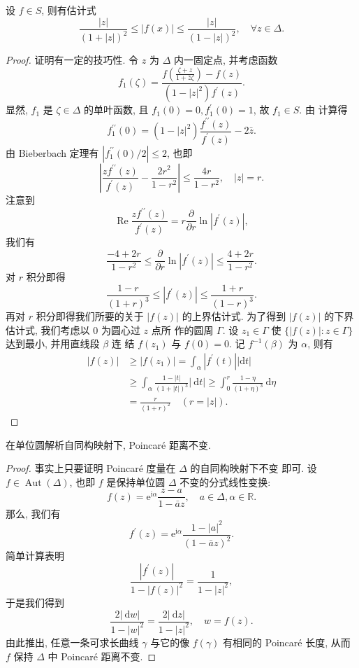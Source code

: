 \begin{thm}[偏差定理] \label{thm: piancha theorem}
    设 $f\in S$, 则有估计式
    \[\frac{|z|}{(1+|z|)^2}\leqslant |f(x)|\leqslant \frac{|z|}{(1-|z|)^2}, \quad\forall z\in \Delta .\]
\end{thm}
\begin{proof}
    证明有一定的技巧性. 令 $z$ 为 $\Delta$ 内一固定点, 并考虑函数
$$
f_1(\zeta)=\frac{f\left(\frac{\zeta+z}{1+\bar{z} \zeta}\right)-f(z)}{\left(1-|z|^2\right) f^{\prime}(z)} .
$$
显然, $f_1$ 是 $\zeta \in \Delta$ 的单叶函数, 且 $f_1(0)=0, f_1^{\prime}(0)=1$, 故 $f_1 \in S$. 由 计算得
$$
f_1^{\prime \prime}(0)=\left(1-|z|^2\right) \frac{f^{\prime \prime}(z)}{f^{\prime}(z)}-2 \bar{z} .
$$
由 Bieberbach 定理有 $\left|f_1^{\prime \prime}(0) / 2\right| \leqslant 2$, 也即
$$
\left|\frac{z f^{\prime \prime}(z)}{f^{\prime}(z)}-\frac{2 r^2}{1-r^2}\right| \leqslant \frac{4 r}{1-r^2}, \quad|z|=r .
$$
注意到
$$
\operatorname{Re} \frac{z f^{\prime \prime}(z)}{f^{\prime}(z)}=r \frac{\partial}{\partial r} \ln \left|f^{\prime}(z)\right|,
$$
我们有
$$
\frac{-4+2 r}{1-r^2} \leqslant \frac{\partial}{\partial r} \ln \left|f^{\prime}(z)\right| \leqslant \frac{4+2 r}{1-r^2} .
$$
对 $r$ 积分即得
$$
\frac{1-r}{(1+r)^3} \leqslant\left|f^{\prime}(z)\right| \leqslant \frac{1+r}{(1-r)^3} .
$$
再对 $r$ 积分即得我们所要的关于 $|f(z)|$ 的上界估计式.
为了得到 $|f(z)|$ 的下界估计式, 我们考虑以 0 为圆心过 $z$ 点所 作的圆周 $\Gamma$. 设 $z_1 \in \Gamma$ 使 $\{|f(z)|: z \in \Gamma\}$ 达到最小, 并用直线段 $\beta$ 连 结 $f\left(z_1\right)$ 与 $f(0)=0$. 记 $f^{-1}(\beta)$ 为 $\alpha$, 则有
$$
\begin{aligned}
|f(z)| & \geqslant\left|f\left(z_1\right)\right|=\int_\alpha\left|f^{\prime}(t)\right||\mathrm{d} t| \\
& \geqslant \int_\alpha \frac{1-|t|}{(1+|t|)^3}|\mathrm{~d} t| \geqslant \int_0^r \frac{1-\eta}{(1+\eta)^3} \mathrm{~d} \eta \\
& =\frac{r}{(1+r)^2} \quad(r=|z|) .
\end{aligned}
$$
\end{proof}
\begin{prop}
    在单位圆解析自同构映射下, Poincar\'{e} 距离不变.
\end{prop}
\begin{proof}
    事实上只要证明 Poincaré 度量在 $\Delta$ 的自同构映射下不变 即可.
设 $f \in \operatorname{Aut}(\Delta)$, 也即 $f$ 是保持单位圆 $\Delta$ 不变的分式线性变换:
$$
f(z)=\mathrm{e}^{\mathrm{i} \alpha} \frac{z-a}{1-\bar{a} z}, \quad a \in \Delta, \alpha \in \mathbb{R} .
$$
那么, 我们有
$$
f^{\prime}(z)=\mathrm{e}^{\mathrm{i} \alpha} \frac{1-|a|^2}{(1-\bar{a} z)^2} .
$$
简单计算表明
$$
\frac{\left|f^{\prime}(z)\right|}{1-|f(z)|^2}=\frac{1}{1-|z|^2},
$$
于是我们得到
$$
\frac{2|\mathrm{~d} w|}{1-|w|^2}=\frac{2|\mathrm{~d} z|}{1-|z|^2}, \quad w=f(z) .
$$
由此推出, 任意一条可求长曲线 $\gamma$ 与它的像 $f(\gamma)$ 有相同的 Poincaré 长度, 从而 $f$ 保持 $\Delta$ 中 Poincaré 距离不变.
\end{proof}
